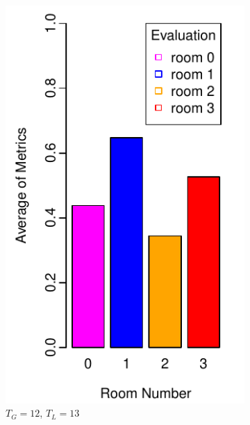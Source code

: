 \documentclass{llncs}
\begin{document}
\begin{figure}[h!]
\begin{subfigure}[b]{0.67\textwidth}
                \label{fig:exp1}
        \end{subfigure}
        
        \begin{subfigure}[b]{0.25\textwidth}
                \includegraphics[width=\textwidth]{PLOT/EVAL/eval3}
                \caption{$T_G = 12$, $T_L = 13$}
                \label{fig:eval1}
        \end{subfigure}%
        \qquad
        \begin{subfigure}[b]{0.67\textwidth}

\end{subfigure}
\end{figure}
\end{document}
